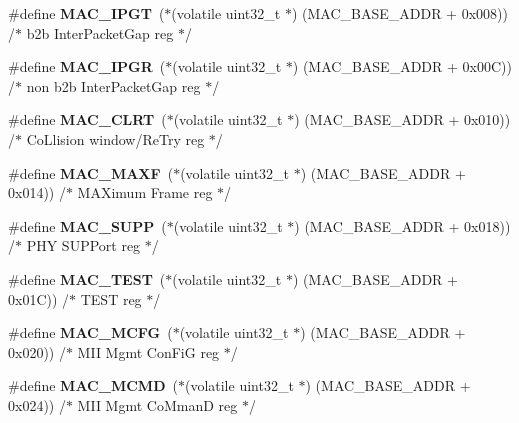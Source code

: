 \begin{DoxyCompactItemize}
\#define {\bfseries M\+A\+C\+\_\+\+I\+P\+GT}~($\ast$(volatile uint32\+\_\+t $\ast$) (M\+A\+C\+\_\+\+B\+A\+S\+E\+\_\+\+A\+D\+DR + 0x008)) /$\ast$ b2b Inter\+Packet\+Gap reg $\ast$/
\item 
\mbox{\label{group__lpc24xx__regs_ga0ca403c47c575c7df5026ede206fab62}} 
\#define {\bfseries M\+A\+C\+\_\+\+I\+P\+GR}~($\ast$(volatile uint32\+\_\+t $\ast$) (M\+A\+C\+\_\+\+B\+A\+S\+E\+\_\+\+A\+D\+DR + 0x00\+C)) /$\ast$ non b2b Inter\+Packet\+Gap reg $\ast$/
\item 
\mbox{\label{group__lpc24xx__regs_ga3b9948538ffbc2eedc6cf2fae791d684}} 
\#define {\bfseries M\+A\+C\+\_\+\+C\+L\+RT}~($\ast$(volatile uint32\+\_\+t $\ast$) (M\+A\+C\+\_\+\+B\+A\+S\+E\+\_\+\+A\+D\+DR + 0x010)) /$\ast$ Co\+Llision window/\+Re\+Try reg $\ast$/
\item 
\mbox{\label{group__lpc24xx__regs_gac80b20a2c78b997770997f4682f7a1e0}} 
\#define {\bfseries M\+A\+C\+\_\+\+M\+A\+XF}~($\ast$(volatile uint32\+\_\+t $\ast$) (M\+A\+C\+\_\+\+B\+A\+S\+E\+\_\+\+A\+D\+DR + 0x014)) /$\ast$ M\+A\+Ximum Frame reg $\ast$/
\item 
\mbox{\label{group__lpc24xx__regs_gae0b795db2052057148f046377f1b954f}} 
\#define {\bfseries M\+A\+C\+\_\+\+S\+U\+PP}~($\ast$(volatile uint32\+\_\+t $\ast$) (M\+A\+C\+\_\+\+B\+A\+S\+E\+\_\+\+A\+D\+DR + 0x018)) /$\ast$ P\+H\+Y S\+U\+P\+Port reg $\ast$/
\item 
\mbox{\label{group__lpc24xx__regs_gab229d3ef2ae755bb581c567d6e28b6ab}} 
\#define {\bfseries M\+A\+C\+\_\+\+T\+E\+ST}~($\ast$(volatile uint32\+\_\+t $\ast$) (M\+A\+C\+\_\+\+B\+A\+S\+E\+\_\+\+A\+D\+DR + 0x01\+C)) /$\ast$ T\+E\+S\+T reg $\ast$/
\item 
\mbox{\label{group__lpc24xx__regs_gaafab2ae92f88fc1db9797271a55ffeed}} 
\#define {\bfseries M\+A\+C\+\_\+\+M\+C\+FG}~($\ast$(volatile uint32\+\_\+t $\ast$) (M\+A\+C\+\_\+\+B\+A\+S\+E\+\_\+\+A\+D\+DR + 0x020)) /$\ast$ M\+I\+I Mgmt Con\+Fi\+G reg $\ast$/
\item 
\mbox{\label{group__lpc24xx__regs_ga4d7a9517d59e8a14c0541ed6fb2c0149}} 
\#define {\bfseries M\+A\+C\+\_\+\+M\+C\+MD}~($\ast$(volatile uint32\+\_\+t $\ast$) (M\+A\+C\+\_\+\+B\+A\+S\+E\+\_\+\+A\+D\+DR + 0x024)) /$\ast$ M\+I\+I Mgmt Co\+Mman\+D reg $\ast$/

\end{DoxyCompactItemize}

